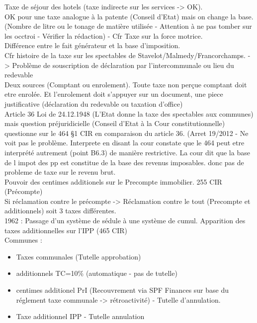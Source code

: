 \documentclass{book}
\begin{document}
Taxe de séjour des hotels (taxe indirecte sur les services -> OK).\\

OK pour une taxe analogue à la patente (Conseil d'Etat) mais on change la base. (Nombre de litre ou le tonage de matière utilisée - Attention à ne pas tomber sur les occtroi - Vérifier la rédaction) - Cfr Taxe sur la force motrice.\\

Différence entre le fait générateur et la base d'imposition.\\

Cfr histoire de la taxe sur les spectables de Stavelot/Malmedy/Francorchamps. -> Problème de souscription de déclaration par l'intercommunale ou lieu du redevable\\

Deux sources (Comptant ou enrolement). Toute taxe non perçue comptant doit etre enrolée. Et l'enrolement doit s'appuyer sur un document, une piece justificative (déclaration du redevable ou taxation d'office)\\

Article 36 Loi de 24.12.1948 (L'Etat donne la taxe des spectables aux communes) mais question préjuridicielle (Conseil  d'Etat à la Cour constitutionnelle) questionne sur le 464 §1 CIR en comparaison du article 36. (Arret 19/2012 - Ne voit pas le problème. Interprete en disant la cour constate que le 464 peut etre interprété autrement (point B6.3) de manière restrictive. La cour dit que la base de l impot des pp est constitue de la base des revenus imposables. donc pas de probleme de taxe sur le revenu brut.\\

Pouvoir des centimes additionels sur le Precompte immobilier. 255 CIR (Précompte)\\

Si réclamation contre le précompte -> Réclamation contre le tout (Precompte et additionnels) soit 3 taxes différentes.\\

1962 : Passage d'un système de sédule à une système de cumul. Apparition des taxes additionnelles sur l'IPP (465 CIR)\\

Communes :\\

\begin{itemize}
\item Taxes communales (Tutelle approbation)
\item additionnels TC=10\% (automatique - pas de tutelle)
\item centimes additionel PrI (Recouvrement via SPF Finances sur base du réglement taxe communale -> rétroactivité) - Tutelle d'annulation.
\item Taxe additionnel IPP - Tutelle annulation
\end{itemize}
\end{document}
